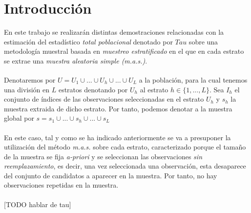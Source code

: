\documentclass{article}
\begin{document}
  \maketitle



  \section{Introducción}

    \paragraph{}
    En este trabajo se realizarán distintas demostraciones relacionadas con la estimación del estadístico \emph{total poblacional} denotado por $Tau$ sobre una metodología muestral basada en \emph{muestreo estratificado} en el que en cada estrato se extrae una \emph{muestra aleatoria simple (m.a.s.)}.

    \paragraph{}
    Denotaremos por $U = U_1 \cup ... \cup U_h \cup... \cup U_L$ a la población, para la cual tenemos una división en $L$ estratos denotando por $U_h$ al estrato $h \in \{1,..., L\}$. Sea $I_h$ el conjunto de índices de las observaciones seleccionadas en el estrato $U_h$ y $s_h$ la muestra extraida de dicho estrato. Por tanto, podemos denotar a la muestra global por $s = s_1 \cup ... \cup s_h \cup ... \cup s_L$

    \paragraph{}
    En este caso, tal y como se ha indicado anteriormente se va a presuponer la utilización del método \emph{m.a.s.} sobre cada estrato, caracterizado porque el tamaño de la muestra se fija \emph{a-priori} y se seleccionan las observaciones \emph{sin reemplazamiento}, es decir, una vez seleccionada una observación, esta desaparece del conjunto de candidatos a aparecer en la muestra. Por tanto, no hay observaciones repetidas en la muestra.

    \paragraph{}
    [TODO hablar de tau]
\end{document}
